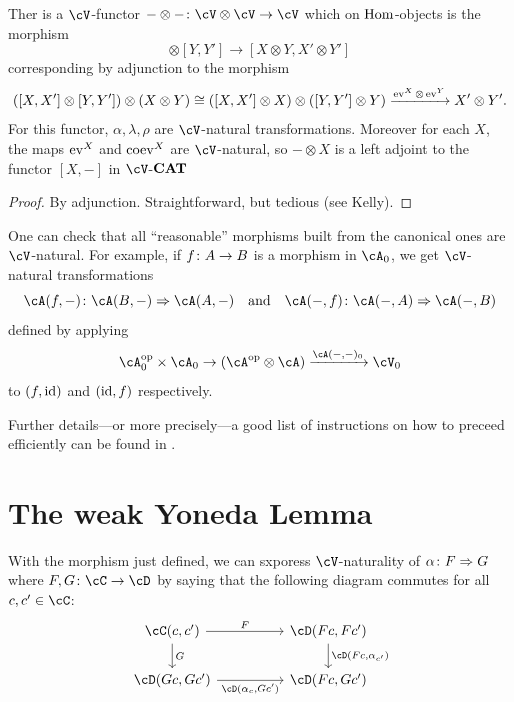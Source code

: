 \documentclass[a4paper,11pt,oneside,openany]{scrbook}
\begin{document}
\begin{prop}
    Ther is a $ \cV $-functor $ -\otimes -\from \cV \otimes \cV \to \cV $ which on $ \operatorname{\text{Hom}} $-objects is the morphism
    \begin{displaymath}
        [X,X']\otimes [Y,Y'] \to [X\otimes Y , X'\otimes Y']
    \end{displaymath}
    corresponding by adjunction to the morphism
    \begin{displaymath}
        ([X,X']\otimes[Y,Y']) \otimes (X\otimes Y)\cong ([X,X']\otimes X)\otimes ([Y,Y']\otimes Y) \xrightarrow{\operatorname{ev}^X \otimes \operatorname{ev}^Y} X'\otimes Y'.
    \end{displaymath}
    For this functor, $ \alpha,\lambda,\rho $ are $ \cV $-natural transformations. Moreover for each $ X $, the maps $ \operatorname{ev}^X $ and $ \operatorname{coev}^X $ are $ \cV $-natural, so $ -\otimes X $ is a left adjoint to the functor $ [X,-] $ in $ \cV $-${\normalfont\textbf{CAT}}$
\end{prop}
\begin{proof}
    By adjunction. Straightforward, but tedious (see Kelly).
\end{proof}
\begin{rmk}
    One can check that all ``reasonable'' morphisms built from the canonical ones are $ \cV $-natural.
    For example, if $ f \colon A \to B $ is a morphism in $ \cA_0 $, we get $ \cV $-natural transformations 
    \begin{displaymath}
        \cA(f,-) \from \cA(B,-)\Rightarrow \cA(A,-) \quad \text{and} \quad  \cA(-,f) \from \cA(-,A) \Rightarrow \cA(-,B) 
    \end{displaymath}defined by applying
    \begin{displaymath}
        \cA_0^{\op}\times \cA_0 \to (\cA^{\op} \otimes \cA) \xrightarrow{\cA(-,-)_0} \cV_0
    \end{displaymath}
    to $ (f,\operatorname{id}) $ and $ (\operatorname{id},f) $ respectively.
    
    Further details---or more precisely---a good list of instructions on how to preceed efficiently can be found in \cite[\S 1.7 and 1.8]{Kelly}.
\end{rmk}


\section{The weak Yoneda Lemma}

\begin{rmk}
    With the morphism just defined, we can sxporess $ \cV $-naturality of $ \alpha \colon F \Rightarrow G $ where $ F,G\from \cC \to \cD $ by saying that the following diagram commutes for all $ c,c' \in \cC $:
    \begin{displaymath}
	\begin{tikzcd}[column sep = huge]
	    \cC(c,c') \arrow[r, "F"]\arrow[d, "G"]& \cD(Fc, Fc')\arrow[d, "{\cD(Fc,\alpha_{c'})}"] \\
	    \cD(Gc,Gc') \arrow[r, "{\cD(\alpha_c, Gc')}"' ]& \cD(Fc,Gc')
        \end{tikzcd}
    \end{displaymath}
\end{rmk}
\end{document}
